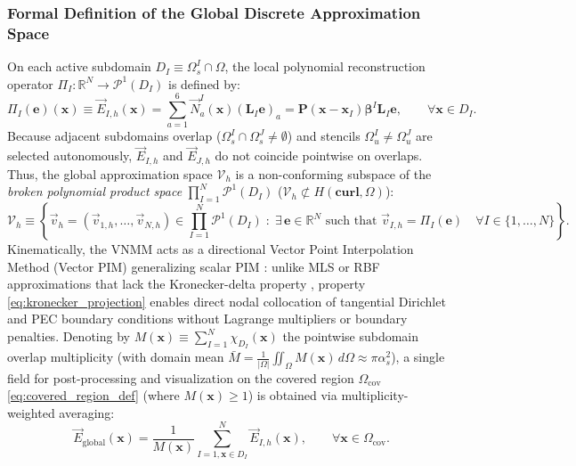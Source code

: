 \documentclass[VANCOUVER,Times1COL]{WileyNJD-v5}
\begin{document}
\subsubsection{Formal Definition of the Global Discrete Approximation Space}
\label{subsubsec:discrete_space_definition}

On each active subdomain $D_I \equiv \Omega_s^I \cap \Omega$, the local polynomial reconstruction operator $\Pi_I: \mathbb{R}^N \to \mathcal{P}^1(D_I)$ is defined by:
\begin{equation}
    \Pi_I(\mathbf{e})(\mathbf{x}) \equiv \vec{E}_{I,h}(\mathbf{x}) = \sum_{a=1}^6 \vec{N}_a^I(\mathbf{x}) (\mathbf{L}_I \mathbf{e})_a = \mathbf{P}(\mathbf{x} - \mathbf{x}_I) \boldsymbol{\beta}^I \mathbf{L}_I \mathbf{e}, \qquad \forall \mathbf{x} \in D_I.
    \label{eq:local_reconstruction_op}
\end{equation}
Because adjacent subdomains overlap ($\Omega_s^I \cap \Omega_s^J \ne \emptyset$) and stencils $\Omega_u^I \ne \Omega_u^J$ are selected autonomously, $\vec{E}_{I,h}$ and $\vec{E}_{J,h}$ do not coincide pointwise on overlaps. Thus, the global approximation space $\mathcal{V}_h$ is a non-conforming subspace of the \emph{broken polynomial product space} $\prod_{I=1}^N \mathcal{P}^1(D_I)$ ($\mathcal{V}_h \not\subset H(\mathbf{curl}, \Omega)$):
\begin{equation}
    \mathcal{V}_h \equiv \left\{ \vec{v}_h = (\vec{v}_{1,h}, \dots, \vec{v}_{N,h}) \in \prod_{I=1}^N \mathcal{P}^1(D_I) \;:\; \exists\, \mathbf{e} \in \mathbb{R}^N \text{ such that } \vec{v}_{I,h} = \Pi_I(\mathbf{e}) \quad \forall I \in \{1, \dots, N\} \right\}.
    \label{eq:global_discrete_space_def}
\end{equation}
Kinematically, the VNMM acts as a directional Vector Point Interpolation Method (Vector PIM) generalizing scalar PIM \cite{liu2001point, liu2005introduction}: unlike MLS or RBF approximations that lack the Kronecker-delta property \cite{atluri2002meshless}, property \eqref{eq:kronecker_projection} enables direct nodal collocation of tangential Dirichlet and PEC boundary conditions without Lagrange multipliers or boundary penalties. Denoting by $M(\mathbf{x}) \equiv \sum_{I=1}^N \chi_{D_I}(\mathbf{x})$ the pointwise subdomain overlap multiplicity (with domain mean $\bar{M} = \frac{1}{|\Omega|}\iint_\Omega M(\mathbf{x})\,d\Omega \approx \pi \alpha_s^2$), a single field for post-processing and visualization on the covered region $\Omega_{\mathrm{cov}}$ \eqref{eq:covered_region_def} (where $M(\mathbf{x}) \ge 1$) is obtained via multiplicity-weighted averaging:
\begin{equation}
    \vec{E}_{\mathrm{global}}(\mathbf{x}) = \frac{1}{M(\mathbf{x})} \sum_{I=1, \mathbf{x} \in D_I}^N \vec{E}_{I,h}(\mathbf{x}), \qquad \forall \mathbf{x} \in \Omega_{\mathrm{cov}}.
    \label{eq:global_field_reconstruction}
\end{equation}
\end{document}
